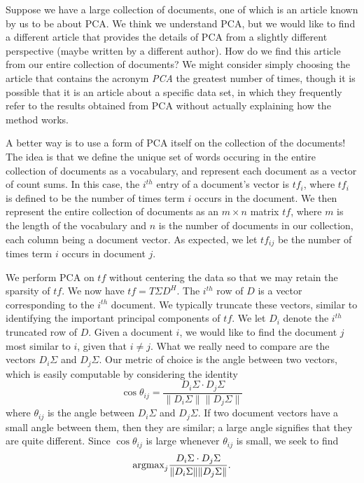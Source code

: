 

Suppose we have a large collection of documents, one of which is an article known by us to be about PCA. We think we understand PCA, but we would like to find a different article that provides the details of PCA from a slightly different perspective (maybe written by a different author). How do we find this article from our entire collection of documents? We might consider simply choosing the article that contains the acronym \emph{PCA} the greatest number of times, though it is possible that it is an article about a specific data set, in which they frequently refer to the results obtained from PCA without actually explaining how the method works.

A better way is to use a form of PCA itself on the collection of the documents! The idea is that we define the unique set of words occuring in the entire collection of documents as a vocabulary, and represent each document as a vector of count sums. In this case, the $i^{th}$ entry of a document's vector is $t\!f_{i}$, where $t\!f_{i}$ is defined to be the number of times term $i$ occurs in the document. We then represent the entire collection of documents as an $m \times n$ matrix $t\!f$, where $m$ is the length of the vocabulary and $n$ is the number of documents in our collection, each column being a document vector. As expected, we let $t\!f_{ij}$ be the number of times term $i$ occurs in document $j$.

We perform PCA on $t\!f$ without centering the data so that we may retain the sparsity of $tf$. We now have $t\!f = T\Sigma D^{H}$. The $i^{th}$ row of $D$ is a vector corresponding to the $i^{th}$ document. We typically truncate these vectors, similar to identifying the important principal components of $t\!f$. We let $D_{i}$ denote the $i^{th}$ truncated row of $D$. Given a document $i$, we would like to find the document $j$ most similar to $i$, given that $i \neq j$. What we really need to compare are the vectors $D_{i}\Sigma$ and $D_{j}\Sigma$. Our metric of choice is the angle between two vectors, which is easily computable by considering the identity $$\cos \theta_{ij} = \frac{D_{i}\Sigma \cdot D_{j}\Sigma}{\|D_{i}\Sigma\| \|D_{j}\Sigma\|}$$ where $\theta_{ij}$ is the angle between $D_{i}\Sigma$ and $D_{j}\Sigma$. If two document vectors have a small angle between them, then they are similar; a large angle signifies that they are quite different. Since $\cos \theta_{ij}$ is large whenever $\theta_{ij}$ is small, we seek to find $$\text{argmax}_{j} \frac{D_{i}\Sigma \cdot D_{j}\Sigma}{\|D_{i}\Sigma\| \|D_{j}\Sigma\|}.$$

